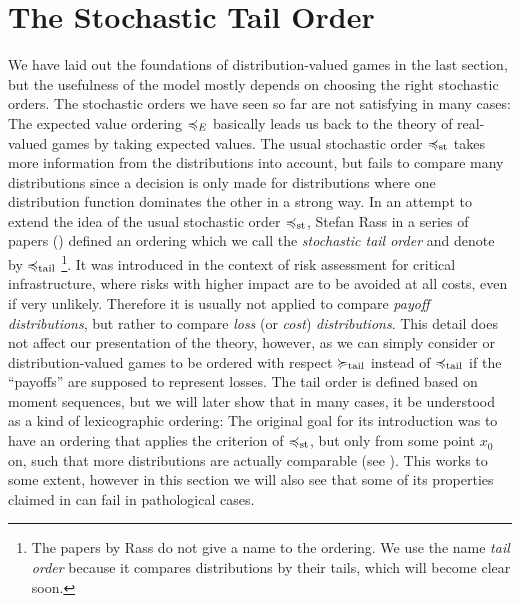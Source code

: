 \documentclass[a4paper,DIV=11,abstracton,twoside=semi]{scrreprt}
\theoremstyle{definition}
\begin{document}
    \section{The Stochastic Tail Order}
    \label{sec:stochasticTailOrder}
    We have laid out the foundations of distribution-valued games in the last section, but the usefulness of the model mostly depends on choosing the right stochastic orders.
    The stochastic orders we have seen so far are not satisfying in many cases: The expected value ordering $\preccurlyeq_E$ basically leads us back to the theory of real-valued games by taking expected values. The usual stochastic order $\preccurlyeq_{\text{st}}$ takes more information from the distributions into account, but fails to compare many distributions since a decision is only made for distributions where one distribution function dominates the other in a strong way.
    In an attempt to extend the idea of the usual stochastic order $\preccurlyeq_{\text{st}}$, Stefan Rass in a series of papers (\cite{bib:rassGameRiskManagI,bib:rassGameRiskManagII,bib:rassTotalOrderingOnLossDistributions}) defined an ordering which we call the \emph{stochastic tail order} and denote by $\preccurlyeq_{\text{tail}}$
    \footnote{The papers by Rass do not give a name to the ordering. We use the name \emph{tail order} because it compares distributions by their tails, which will become clear soon.}.
    It was introduced in the context of risk assessment for critical infrastructure, where risks with higher impact are to  be avoided at all costs, even if very unlikely.
    Therefore it is usually not applied to compare \emph{payoff distributions}, but rather to compare \emph{loss} (or \emph{cost}) \emph{distributions}. This detail does not affect our presentation of the theory, however, as we can simply consider or distribution-valued games to be ordered with respect $\succcurlyeq_{\text{tail}}$ instead of $\preccurlyeq_{\text{tail}}$ if the “payoffs” are supposed to represent losses.
    The tail order is defined based on moment sequences, but we will later show that in many cases, it be understood as a kind of lexicographic ordering: The original goal for its introduction was to have an ordering that applies the criterion of $\preccurlyeq_{\text{st}}$, but only from some point $x_0$ on, such that more distributions are actually comparable (see \cite{bib:rassTotalOrderingOnLossDistributions}). This works to some extent, however in this section we will also see that some of its properties claimed in \cite{bib:rassTotalOrderingOnLossDistributions} can fail in pathological cases.
\end{document}
